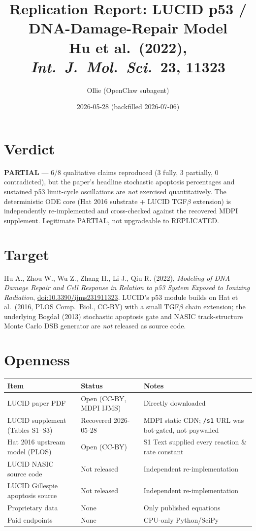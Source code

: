 \documentclass[11pt]{article}
\title{Replication Report: LUCID p53 / DNA-Damage-Repair Model\\
\large Hu et al.\ (2022), \textit{Int.\ J.\ Mol.\ Sci.\ }\textbf{23}, 11323}
\author{Ollie (OpenClaw subagent)}
\date{2026-05-28 (backfilled 2026-07-06)}
\begin{document}
\maketitle

\section*{Verdict}
\textbf{PARTIAL} --- 6/8 qualitative claims reproduced (3 fully, 3 partially,
0 contradicted), but the paper's headline stochastic apoptosis percentages
and sustained p53 limit-cycle oscillations are \emph{not} exercised
quantitatively. The deterministic ODE core (Hat 2016 substrate + LUCID TGF$\beta$
extension) is independently re-implemented and cross-checked against the
recovered MDPI supplement. Legitimate PARTIAL, not upgradeable to REPLICATED.

\section{Target}
Hu A., Zhou W., Wu Z., Zhang H., Li J., Qiu R. (2022),
\emph{Modeling of DNA Damage Repair and Cell Response in Relation to p53
System Exposed to Ionizing Radiation},
\href{https://doi.org/10.3390/ijms231911323}{doi:10.3390/ijms231911323}.
LUCID's p53 module builds on Hat et al.\ (2016, PLOS Comp.\ Biol.,
CC-BY) with a small TGF$\beta$ chain extension; the underlying Bogda\l{}
(2013) stochastic apoptosis gate and NASIC track-structure Monte Carlo
DSB generator are \emph{not} released as source code.

\section{Openness}
\begin{tabular}{lll}
\toprule
Item & Status & Notes \\
\midrule
LUCID paper PDF                     & Open (CC-BY, MDPI IJMS) & Directly downloaded \\
LUCID supplement (Tables S1--S3)    & Recovered 2026-05-28    & MDPI static CDN; \texttt{/s1} URL was bot-gated, not paywalled \\
Hat 2016 upstream model (PLOS)      & Open (CC-BY)            & S1 Text supplied every reaction \& rate constant \\
LUCID NASIC source code             & Not released            & Independent re-implementation \\
LUCID Gillespie apoptosis source    & Not released            & Independent re-implementation \\
Proprietary data                    & None                    & Only published equations \\
Paid endpoints                      & None                    & CPU-only Python/SciPy \\
\bottomrule
\end{tabular}
\end{document}

